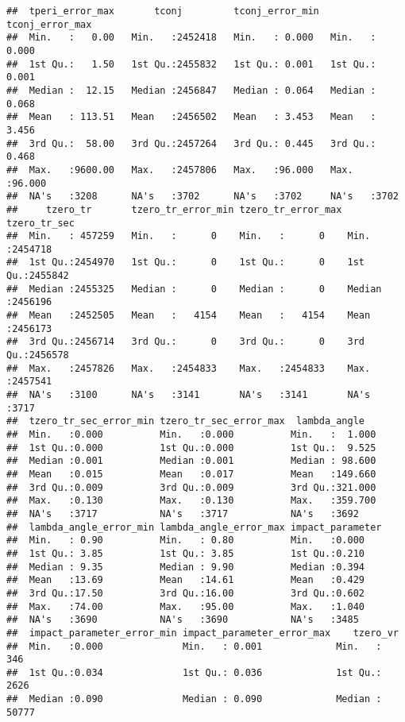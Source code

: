 \documentclass[]{article}
\begin{document}
\begin{verbatim}
##  tperi_error_max       tconj         tconj_error_min  tconj_error_max 
##  Min.   :   0.00   Min.   :2452418   Min.   : 0.000   Min.   : 0.000  
##  1st Qu.:   1.50   1st Qu.:2455832   1st Qu.: 0.001   1st Qu.: 0.001  
##  Median :  12.15   Median :2456847   Median : 0.064   Median : 0.068  
##  Mean   : 113.51   Mean   :2456502   Mean   : 3.453   Mean   : 3.456  
##  3rd Qu.:  58.00   3rd Qu.:2457264   3rd Qu.: 0.445   3rd Qu.: 0.468  
##  Max.   :9600.00   Max.   :2457806   Max.   :96.000   Max.   :96.000  
##  NA's   :3208      NA's   :3702      NA's   :3702     NA's   :3702    
##     tzero_tr       tzero_tr_error_min tzero_tr_error_max  tzero_tr_sec    
##  Min.   : 457259   Min.   :      0    Min.   :      0    Min.   :2454718  
##  1st Qu.:2454970   1st Qu.:      0    1st Qu.:      0    1st Qu.:2455842  
##  Median :2455325   Median :      0    Median :      0    Median :2456196  
##  Mean   :2452505   Mean   :   4154    Mean   :   4154    Mean   :2456173  
##  3rd Qu.:2456714   3rd Qu.:      0    3rd Qu.:      0    3rd Qu.:2456578  
##  Max.   :2457826   Max.   :2454833    Max.   :2454833    Max.   :2457541  
##  NA's   :3100      NA's   :3141       NA's   :3141       NA's   :3717     
##  tzero_tr_sec_error_min tzero_tr_sec_error_max  lambda_angle    
##  Min.   :0.000          Min.   :0.000          Min.   :  1.000  
##  1st Qu.:0.000          1st Qu.:0.000          1st Qu.:  9.525  
##  Median :0.001          Median :0.001          Median : 98.600  
##  Mean   :0.015          Mean   :0.017          Mean   :149.660  
##  3rd Qu.:0.009          3rd Qu.:0.009          3rd Qu.:321.000  
##  Max.   :0.130          Max.   :0.130          Max.   :359.700  
##  NA's   :3717           NA's   :3717           NA's   :3692     
##  lambda_angle_error_min lambda_angle_error_max impact_parameter
##  Min.   : 0.90          Min.   : 0.80          Min.   :0.000   
##  1st Qu.: 3.85          1st Qu.: 3.85          1st Qu.:0.210   
##  Median : 9.35          Median : 9.90          Median :0.394   
##  Mean   :13.69          Mean   :14.61          Mean   :0.429   
##  3rd Qu.:17.50          3rd Qu.:16.00          3rd Qu.:0.602   
##  Max.   :74.00          Max.   :95.00          Max.   :1.040   
##  NA's   :3690           NA's   :3690           NA's   :3485    
##  impact_parameter_error_min impact_parameter_error_max    tzero_vr      
##  Min.   :0.000              Min.   : 0.001             Min.   :    346  
##  1st Qu.:0.034              1st Qu.: 0.036             1st Qu.:   2626  
##  Median :0.090              Median : 0.090             Median :  50777  

\end{verbatim}
\end{document}
